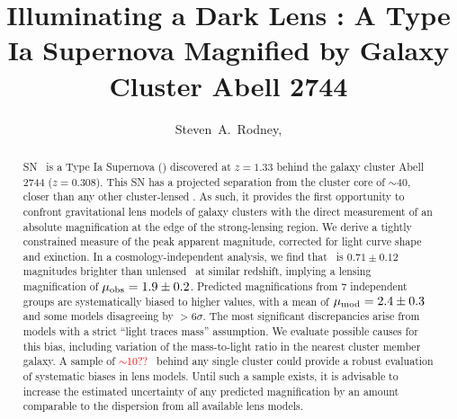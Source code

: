 







\title{Illuminating a Dark Lens : A Type Ia Supernova Magnified by Galaxy Cluster Abell 2744}

\author{
 Steven~A.~Rodney,
  \etal
}



\begin{abstract}
SN \tomas\ is a Type Ia Supernova (\SNIa) discovered at $z=1.33$
behind the galaxy cluster Abell 2744 ($z=0.308$). This SN has a
projected separation from the cluster core of $\sim$40\arcsec, closer
than any other cluster-lensed \SNIa.  As such, it provides the first
opportunity to confront gravitational lens models of galaxy clusters
with the direct measurement of an absolute magnification at the edge
of the strong-lensing region.  We derive a tightly constrained measure
of the peak apparent magnitude, corrected for light curve shape and
exinction.  In a cosmology-independent analysis, we find that \tomas\
is $0.71\pm0.12$ magnitudes brighter than unlensed \SNeIa\ at similar
redshift, implying a lensing magnification of $\mu_{\rm
obs}=1.9\pm0.2$.  Predicted magnifications from 7 independent groups
are systematically biased to higher values, with a mean of $\mu_{\rm
mod}=2.4\pm0.3$ and some models disagreeing by $>6\sigma$.  The most
significant discrepancies arise from models with a strict ``light
traces mass'' assumption.  We evaluate possible causes for this bias,
including variation of the mass-to-light ratio in the nearest cluster
member galaxy.  A sample of \textcolor{red}{$\sim$10??} \SNeIa\ behind
any single cluster could provide a robust evaluation of systematic
biases in lens models.  Until such a sample exists, it is advisable to
increase the estimated uncertainty of any predicted magnification
by an amount comparable to the dispersion from all available lens
models.

\end{abstract}

